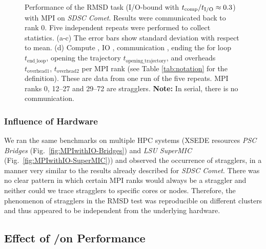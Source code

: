 \begin{figure}
\caption{Performance of the RMSD task (I/O-bound with ${t}_{\text{comp}}/{t}_{\text{I/O}} \approx 0.3$) with MPI on \emph{SDSC Comet}.
Results were communicated back to rank 0. Five independent repeats were performed to collect statistics. (a-c) The error bars show
standard deviation with respect to mean. (d) Compute \tcomp, IO \tIO, communication \tcomm, ending the for loop $t_{\text{end\_loop}}$,
  opening the trajectory $t_{\text{opening\_trajectory}}$, and overheads $t_{\text{overhead1}}$, $t_{\text{overhead2}}$ per MPI rank (see Table \ref{tab:notation} for the definition).
These are data from one run of the five repeats. MPI ranks 0, 12--27 and 29--72 are stragglers. \textbf{Note:} In serial, there is no communication.}
\label{fig:MPIwithIO}
\end{figure} 

\subsubsection*{Influence of Hardware}
We ran the same benchmarks on multiple HPC systems (XSEDE resources \emph{PSC Bridges} (Fig.~\ref{fig:MPIwithIO-Bridges}) and \emph{LSU SuperMIC} (Fig.~\ref{fig:MPIwithIO-SuperMIC})) and observed the occurrence of stragglers, in a manner very similar to the results already described for \emph{SDSC Comet}.
There was no clear pattern in which certain MPI ranks would always be a straggler and neither could we trace stragglers to specific cores or nodes. 
Therefore, the phenomenon of stragglers in the RMSD test was reproducible on different clusters and thus appeared to be independent from the underlying hardware.

\subsection{Effect of \tcomp/\tIO on Performance}
\label{sec:bound}

